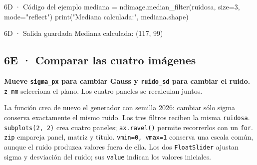 \begin{CodigoVivo}{6D · Código del ejemplo}
mediana = ndimage.median_filter(ruidosa, size=3, mode="reflect")
print("Mediana calculada:", mediana.shape)
\end{CodigoVivo}


\begin{Salida}{6D · Salida guardada}
Mediana calculada: (117, 99)
\end{Salida}



\subsection*{6E · Comparar las cuatro imágenes}

\label{vivo:6e}

\textbf{Mueve \texttt{\small sigma\_px} para cambiar Gauss y \texttt{\small ruido\_sd} para cambiar el ruido.} \texttt{\small z\_mm} selecciona el plano. Los cuatro paneles se recalculan juntos.

La función crea de nuevo el generador con semilla 2026: cambiar sólo sigma conserva exactamente el mismo ruido. Los tres filtros reciben la misma \texttt{\small ruidosa}. \texttt{\small subplots(\allowbreak{}2,\allowbreak{} 2)\allowbreak{}} crea cuatro paneles; \texttt{\small ax.\allowbreak{}ravel(\allowbreak{})\allowbreak{}} permite recorrerlos con un \texttt{\small for}. \texttt{\small zip} empareja panel, matriz y título. \texttt{\small vmin=0,\allowbreak{} vmax=1} conserva una escala común, aunque el ruido produzca valores fuera de ella. Los dos \texttt{\small FloatSlider} ajustan sigma y desviación del ruido; sus \texttt{\small value} indican los valores iniciales.

